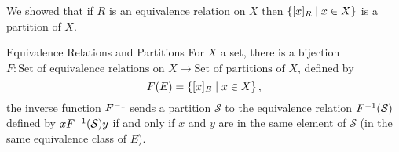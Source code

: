 \documentclass[class=article, crop=false]{standalone}
\begin{document}
  \begin{note}{}
    We showed that if $R$ is an equivalence relation on $X$ then $\left\{[x]_R\mid x\in X\right\}$ is a partition of $X$.
  \end{note}
  \begin{theorem}{Equivalence Relations and Partitions}
    For $X$ a set, there is a bijection $F\colon \text{Set of equivalence relations on $X$}\to \text{Set of partitions of $X$}$, defined by
    \[
      F(E) = \left\{[x]_E\mid x\in X\right\},
    \]
    the inverse function $F^{-1}$ sends a partition $\mathcal{S}$ to the equivalence relation $F^{-1}(\mathcal{S})$ defined by $xF^{-1}(\mathcal{S})y$ if and only if $x$ and $y$ are in the same element of $\mathcal{S}$ (in the same equivalence class of $E$).
  \end{theorem}
\end{document}
